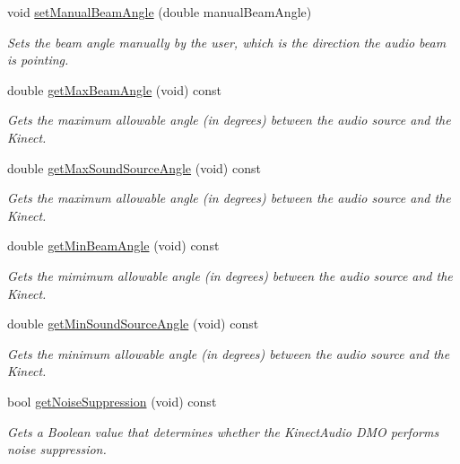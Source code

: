 \begin{DoxyCompactItemize}
void \hyperlink{class_kinect_audio_source_a75ced5a6dc647a8f582b90a12c544d79}{set\-Manual\-Beam\-Angle} (double manual\-Beam\-Angle)
\begin{DoxyCompactList}\small\item\em \-Sets the beam angle manually by the user, which is the direction the audio beam is pointing. \end{DoxyCompactList}\item 
double \hyperlink{class_kinect_audio_source_a1256cc65fa0efd3195ed309a419dbbaf}{get\-Max\-Beam\-Angle} (void) const 
\begin{DoxyCompactList}\small\item\em \-Gets the maximum allowable angle (in degrees) between the audio source and the \-Kinect. \end{DoxyCompactList}\item 
double \hyperlink{class_kinect_audio_source_ac8a14785697b3191c4621e201649b232}{get\-Max\-Sound\-Source\-Angle} (void) const 
\begin{DoxyCompactList}\small\item\em \-Gets the maximum allowable angle (in degrees) between the audio source and the \-Kinect. \end{DoxyCompactList}\item 
double \hyperlink{class_kinect_audio_source_aa12cd7aa6cd90e899d34ef19c7cc7137}{get\-Min\-Beam\-Angle} (void) const 
\begin{DoxyCompactList}\small\item\em \-Gets the mimimum allowable angle (in degrees) between the audio source and the \-Kinect. \end{DoxyCompactList}\item 
double \hyperlink{class_kinect_audio_source_ace385c4905c0e10ec398a2a9f1946faf}{get\-Min\-Sound\-Source\-Angle} (void) const 
\begin{DoxyCompactList}\small\item\em \-Gets the minimum allowable angle (in degrees) between the audio source and the \-Kinect. \end{DoxyCompactList}\item 
bool \hyperlink{class_kinect_audio_source_ad28421a69e713dfa4c4f95d3bdfc91be}{get\-Noise\-Suppression} (void) const 
\begin{DoxyCompactList}\small\item\em \-Gets a \-Boolean value that determines whether the \-Kinect\-Audio \-D\-M\-O performs noise suppression. \end{DoxyCompactList}\item 

\end{DoxyCompactItemize}
